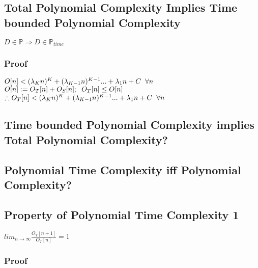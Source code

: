 \documentclass[11pt]{article}
\begin{document}
\subsection{Total Polynomial Complexity Implies Time bounded Polynomial Complexity}
\begin{center}
\vspace{1mm}
$
D \in \mathbb{P} \Longrightarrow D \in \mathbb{P}_{time}
$
\end{center}

\subsubsection{Proof}
\begin{center}
$
O[n] < (\lambda_K n)^K + (\lambda_{K-1} n)^{K-1}... + \lambda_1 n + C \hspace{2mm} \forall n
$
\\ \vspace{2mm}
$
O[n] := O_T[n] + O_S[n]; \hspace{2mm} O_T[n] \leq O[n]
$
\\ \vspace{2mm}
$
\therefore O_T[n] < (\lambda_K n)^K + (\lambda_{K-1} n)^{K-1}... + \lambda_1 n + C \hspace{2mm} \forall n
$
\end{center}






\subsection{Time bounded Polynomial Complexity implies Total Polynomial Complexity?}
\subsection{Polynomial Time Complexity iff Polynomial Complexity?}




\subsection{Property of Polynomial Time Complexity 1}
\begin{center}
$
lim_{n \rightarrow \infty} \frac{O_T[n+1]}{O_T[n]} = 1
$
\end{center}
\subsubsection{Proof}
\end{document}
